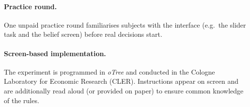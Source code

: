 \documentclass[
    11pt,
    a4paper,
    parskip=half,
    headings=normal
]{scrartcl}
\numberwithin{equation}{section}
\theoremstyle{definition}
\theoremstyle{remark}
\begin{document}
\paragraph{Practice round.}
One unpaid practice round familiarises subjects with the interface
(e.g.\ the slider task and the belief screen) before real decisions start.

\paragraph{Screen-based implementation.}
The experiment is programmed in \textit{oTree} and conducted in the
Cologne Laboratory for Economic Research (CLER). Instructions appear
on screen and are additionally read aloud (or provided on paper) to ensure
common knowledge of the rules.

\newpage


\printbibliography
\end{document}
